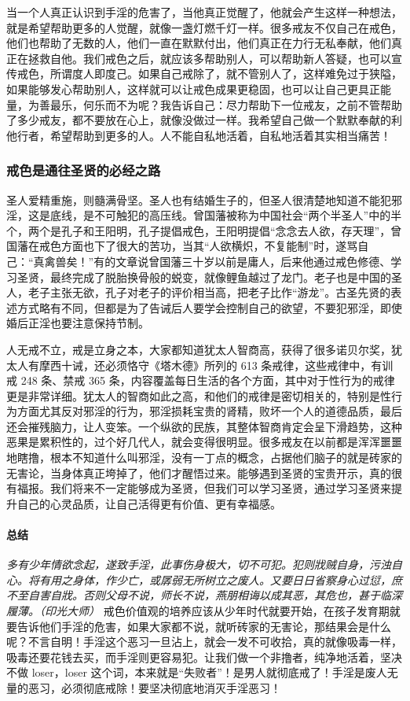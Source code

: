 当一个人真正认识到手淫的危害了，当他真正觉醒了，他就会产生这样一种想法，就是希望帮助更多的人觉醒，就像一盏灯燃千灯一样。很多戒友不仅自己在戒色，他们也帮助了无数的人，他们一直在默默付出，他们真正在力行无私奉献，他们真正在拯救自他。我们戒色之后，就应该多帮助别人，可以帮助新人答疑，也可以宣传戒色，所谓度人即度己。如果自己戒除了，就不管别人了，这样难免过于狭隘，如果能够发心帮助别人，这样就可以让戒色成果更稳固，也可以让自己更具正能量，为善最乐，何乐而不为呢？我告诉自己：尽力帮助下一位戒友，之前不管帮助了多少戒友，都不要放在心上，就像没做过一样。我希望自己做一个默默奉献的利他行者，希望帮助到更多的人。人不能自私地活着，自私地活着其实相当痛苦！

\subsubsection{戒色是通往圣贤的必经之路}

圣人爱精重施，则髓满骨坚。圣人也有结婚生子的，但圣人很清楚地知道不能犯邪淫，这是底线，是不可触犯的高压线。曾国藩被称为中国社会“两个半圣人”中的半个，两个是孔子和王阳明，孔子提倡戒色，王阳明提倡“念念去人欲，存天理”，曾国藩在戒色方面也下了很大的苦功，当其“人欲横炽，不复能制”时，遂骂自己：“真禽兽矣！”有的文章说曾国藩三十岁以前是庸人，后来他通过戒色修德、学习圣贤，最终完成了脱胎换骨般的蜕变，就像鲤鱼越过了龙门。老子也是中国的圣人，老子主张无欲，孔子对老子的评价相当高，把老子比作“游龙”。古圣先贤的表述方式略有不同，但都是为了告诫后人要学会控制自己的欲望，不要犯邪淫，即使婚后正淫也要注意保持节制。

人无戒不立，戒是立身之本，大家都知道犹太人智商高，获得了很多诺贝尔奖，犹太人有摩西十诫，还必须恪守《塔木德》所列的 613 条戒律，这些戒律中，有训戒 248 条、禁戒 365 条，内容覆盖每日生活的各个方面，其中对于性行为的戒律更是非常详细。犹太人的智商如此之高，和他们的戒律是密切相关的，特别是性行为方面尤其反对邪淫的行为，邪淫损耗宝贵的肾精，败坏一个人的道德品质，最后还会摧残脑力，让人变笨。一个纵欲的民族，其整体智商肯定会呈下滑趋势，这种恶果是累积性的，过个好几代人，就会变得很明显。很多戒友在以前都是浑浑噩噩地瞎撸，根本不知道什么叫邪淫，没有一丁点的概念，占据他们脑子的就是砖家的无害论，当身体真正垮掉了，他们才醒悟过来。能够遇到圣贤的宝贵开示，真的很有福报。我们将来不一定能够成为圣贤，但我们可以学习圣贤，通过学习圣贤来提升自己的心灵品质，让自己活得更有价值、更有幸福感。

\paragraph*{总结}

\textit{多有少年情欲念起，遂致手淫，此事伤身极大，切不可犯。犯则戕贼自身，污浊自心。将有用之身体，作少亡，或孱弱无所树立之废人。又要日日省察身心过愆，庶不至自害自戕。否则父母不说，师长不说，燕朋相诲以成其恶，其危也，甚于临深履薄。（印光大师）} 戒色价值观的培养应该从少年时代就要开始，在孩子发育期就要告诉他们手淫的危害，如果大家都不说，就听砖家的无害论，那结果会是什么呢？不言自明！手淫这个恶习一旦沾上，就会一发不可收拾，真的就像吸毒一样，吸毒还要花钱去买，而手淫则更容易犯。让我们做一个非撸者，纯净地活着，坚决不做 loser，loser 这个词，本来就是“失败者”！是男人就彻底戒了！手淫是废人无量的恶习，必须彻底戒除！要坚决彻底地消灭手淫恶习！

